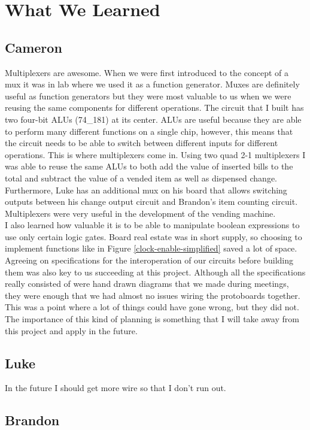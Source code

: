 \section{What We Learned} 

\subsection{Cameron}
Multiplexers are awesome. When we were first introduced to the concept of a mux it was in lab where we used it as a function generator. Muxes are definitely useful as function generators but they were most valuable to us when we were reusing the same components for different operations. The circuit that I built has two four-bit ALUs (74\_181) at its center. ALUs are useful because they are able to perform many different functions on a single chip, however, this means that the circuit needs to be able to switch between different inputs for different operations. This is where multiplexers come in. Using two quad 2-1 multiplexers I was able to reuse the same ALUs to both add the value of inserted bills to the total and subtract the value of a vended item as well as dispensed change. Furthermore, Luke has an additional mux on his board that allows switching outputs between his change output circuit and Brandon's item counting circuit. Multiplexers were very useful in the development of the vending machine. \\

I also learned how valuable it is to be able to manipulate boolean expressions to use only certain logic gates. Board real estate was in short supply, so choosing to implement functions like in Figure \ref{clock-enable-simplified} saved a lot of space. \\

Agreeing on specifications for the interoperation of our circuits before building them was also key to us succeeding at this project. Although all the specifications really consisted of were hand drawn diagrams that we made during meetings, they were enough that we had almost no issues wiring the protoboards together. This was a point where a lot of things could have gone wrong, but they did not. The importance of this kind of planning is something that I will take away from this project and apply in the future. 

\subsection{Luke} 
In the future I should get more wire so that I don't run out.
\subsection{Brandon}
